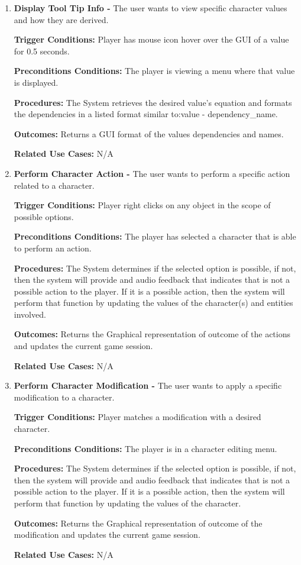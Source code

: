 \documentclass{article}
\begin{document}
\begin{enumerate}[{PUC}1. ]
	\item \textbf{Display Tool Tip Info -} The user wants to view specific character values and how they are derived.\par
\textbf{Trigger Conditions: }Player has mouse icon hover over the GUI of a value for 0.5 seconds. \par
\textbf{Preconditions Conditions: }The player is viewing a menu where that value is displayed. \par
\textbf{Procedures: }The System retrieves the desired value's equation and formats the dependencies in a listed format similar to:\newline value - dependency\_name. \par
\textbf{Outcomes: }Returns a GUI format of the values dependencies and names. \par
\textbf{Related Use Cases: }N/A \par

	\item \textbf{Perform Character Action -} The user wants to perform a specific action related to a character.\par
\textbf{Trigger Conditions: }Player right clicks on any object in the scope of possible options. \par
\textbf{Preconditions Conditions: }The player has selected a character that is able to perform an action. \par
\textbf{Procedures: }The System determines if the selected option is possible, if not, then the system will provide and audio feedback that indicates that is not a possible action to the player. If it is a possible action, then the system will perform that function by updating the values of the character(s) and entities involved. \par
\textbf{Outcomes: }Returns the Graphical representation of outcome of the actions and updates the current game session. \par
\textbf{Related Use Cases: }N/A \par

	\item \textbf{Perform Character Modification -} The user wants to apply a specific modification to a character.\par
\textbf{Trigger Conditions: }Player matches a modification with a desired character. \par
\textbf{Preconditions Conditions: }The player is in a character editing menu. \par
\textbf{Procedures: }The System determines if the selected option is possible, if not, then the system will provide and audio feedback that indicates that is not a possible action to the player. If it is a possible action, then the system will perform that function by updating the values of the character. \par
\textbf{Outcomes: }Returns the Graphical representation of outcome of the modification and updates the current game session. \par
\textbf{Related Use Cases: }N/A \par


\end{enumerate}
\end{document}
